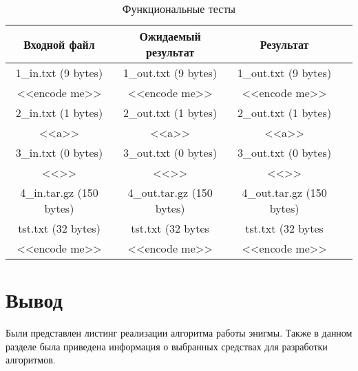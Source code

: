 \begin{table}[h]
	\begin{center}
		\begin{threeparttable}
			\captionsetup{justification=raggedright,singlelinecheck=off}
			\caption{\label{tbl:functional_} Функциональные тесты}
			\begin{tabular}{|c|c|c|c|}
				\hline
				Входной файл & Ожидаемый результат & Результат \\ 
				\hline
				1\_in.txt (9 bytes) & 1\_out.txt (9 bytes) & 1\_out.txt (9 bytes)\\
				<<encode me>> & <<encode me>> &<<encode me>>\\
				\hline
				2\_in.txt (1 bytes) & 2\_out.txt (1 bytes) & 2\_out.txt (1 bytes)\\
				<<a>> & <<a>> &<<a>>\\
				\hline
				3\_in.txt (0 bytes) & 3\_out.txt (0 bytes) & 3\_out.txt (0 bytes)\\
				<<>> & <<>> &<<>>\\
				\hline
				4\_in.tar.gz (150 bytes) & 4\_out.tar.gz (150 bytes) & 4\_out.tar.gz (150 bytes)\\
				tst.txt (32 bytes)& tst.txt (32 bytes &tst.txt (32 bytes\\
				<<encode me>> & <<encode me>> &<<encode me>>\\
				\hline
			\end{tabular}
		\end{threeparttable}
	\end{center}
\end{table}
\FloatBarrier

\section*{Вывод}

Были представлен листинг реализации алгоритма работы энигмы. Также в данном разделе была приведена информация о выбранных средствах для разработки алгоритмов.
